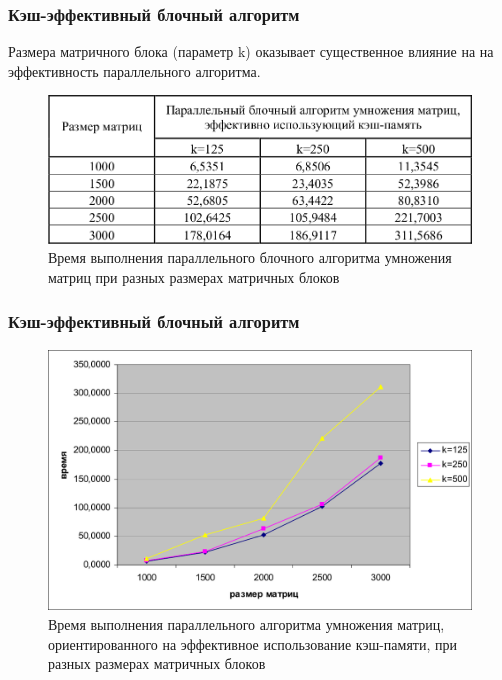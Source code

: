 \documentclass{beamer}
\begin{document}
\begin{frame}
\frametitle{Кэш-эффективный блочный алгоритм}

Размера матричного блока (параметр k) оказывает существенное влияние на на эффективность параллельного алгоритма.

\begin{figure}
\includegraphics[scale=0.30]{res/pic016}
\caption{Время выполнения параллельного блочного алгоритма умножения матриц при разных
размерах матричных блоков}
\end{figure}

\end{frame}


\begin{frame}
\frametitle{Кэш-эффективный блочный алгоритм}

\begin{figure}
\includegraphics[scale=0.27]{res/pic017}
\caption{Время выполнения параллельного алгоритма умножения матриц, ориентированного на эффективное использование кэш-памяти, при разных размерах матричных блоков}
\end{figure}

\end{frame}
\end{document}
